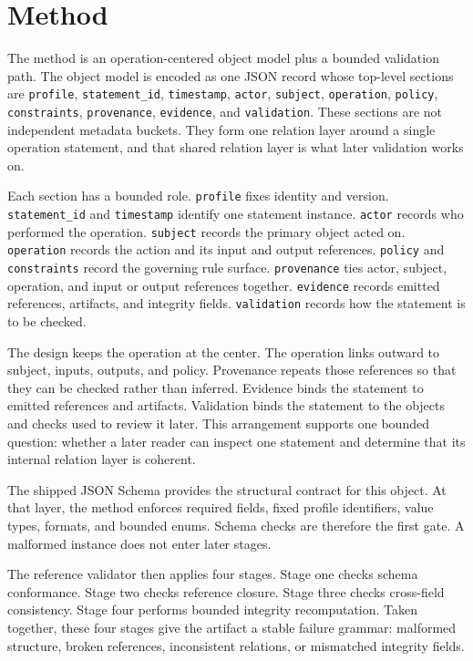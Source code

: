 \documentclass[conference]{IEEEtran}
\begin{document}
\section{Method}

The method is an operation-centered object model plus a bounded validation path. The object model is encoded as one JSON record whose top-level sections are \texttt{profile}, \texttt{statement\_id}, \texttt{timestamp}, \texttt{actor}, \texttt{subject}, \texttt{operation}, \texttt{policy}, \texttt{constraints}, \texttt{provenance}, \texttt{evidence}, and \texttt{validation}. These sections are not independent metadata buckets. They form one relation layer around a single operation statement, and that shared relation layer is what later validation works on.

Each section has a bounded role. \texttt{profile} fixes identity and version. \texttt{statement\_id} and \texttt{timestamp} identify one statement instance. \texttt{actor} records who performed the operation. \texttt{subject} records the primary object acted on. \texttt{operation} records the action and its input and output references. \texttt{policy} and \texttt{constraints} record the governing rule surface. \texttt{provenance} ties actor, subject, operation, and input or output references together. \texttt{evidence} records emitted references, artifacts, and integrity fields. \texttt{validation} records how the statement is to be checked.

The design keeps the operation at the center. The operation links outward to subject, inputs, outputs, and policy. Provenance repeats those references so that they can be checked rather than inferred. Evidence binds the statement to emitted references and artifacts. Validation binds the statement to the objects and checks used to review it later. This arrangement supports one bounded question: whether a later reader can inspect one statement and determine that its internal relation layer is coherent.

The shipped JSON Schema provides the structural contract for this object. At that layer, the method enforces required fields, fixed profile identifiers, value types, formats, and bounded enums. Schema checks are therefore the first gate. A malformed instance does not enter later stages.

The reference validator then applies four stages. Stage one checks schema conformance. Stage two checks reference closure. Stage three checks cross-field consistency. Stage four performs bounded integrity recomputation. Taken together, these four stages give the artifact a stable failure grammar: malformed structure, broken references, inconsistent relations, or mismatched integrity fields.
\end{document}
